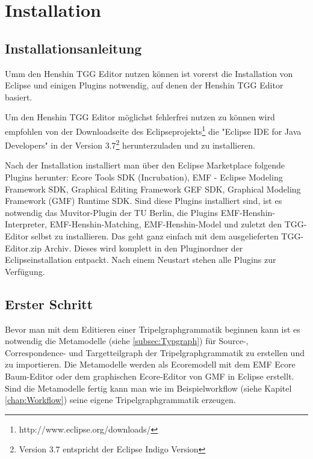 \chapter{Installation}\label{chap:Installation}

\section{Installationsanleitung}
Umm den Henshin TGG Editor nutzen können ist vorerst die Installation von Eclipse und einigen Plugins notwendig, auf denen der Henshin TGG Editor basiert.

Um den Henshin TGG Editor möglichst fehlerfrei nutzen zu können wird empfohlen von der Downloadseite des Eclipseprojekts\footnote{http://www.eclipse.org/downloads/} die "Eclipse IDE for Java Developers" in der Version 3.7\footnote{Version 3.7 entspricht der Eclipse Indigo Version} herunterzuladen und zu installieren.

Nach der Installation installiert man über den Eclipse Marketplace folgende Plugins herunter: Ecore Tools SDK (Incrubation), EMF - Eclipse Modeling Framework SDK, Graphical Editing Framework GEF SDK, Graphical Modeling Framework (GMF) Runtime SDK. Sind diese Plugins installiert sind, ist es notwendig das Muvitor-Plugin der TU Berlin, die Plugins EMF-Henshin-Interpreter, EMF-Henshin-Matching, EMF-Henshin-Model und zuletzt den TGG-Editor selbst zu installieren. Das geht ganz einfach mit dem ausgelieferten TGG-Editor.zip Archiv. Dieses wird komplett in den Pluginordner der Eclipseinstallation entpackt. Nach einem Neustart stehen alle Plugins zur Verfügung.

\section{Erster Schritt}
Bevor man mit dem Editieren einer Tripelgraphgrammatik beginnen kann ist es notwendig die Metamodelle (siehe \ref{subsec:Typgraph}) für Source-, Correspondence- und Targetteilgraph der Tripelgraphgrammatik zu erstellen und zu importieren.
Die Metamodelle werden als Ecoremodell mit dem EMF Ecore Baum-Editor oder dem graphischen Ecore-Editor von GMF in Eclipse erstellt.
Sind die Metamodelle fertig kann man wie im Beispielworkflow (siehe Kapitel \ref{chap:Workflow}) seine eigene Tripelgraphgrammatik erzeugen.
